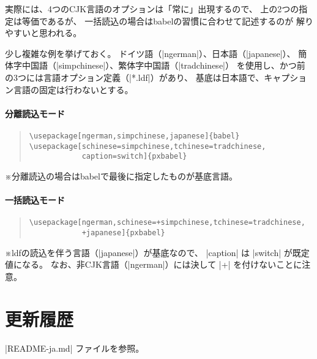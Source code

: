 \documentclass[a4paper,uplatex]{jsarticle}
\newcommand{\Pkg}[1]{\textsf{#1}}
\newcommand{\Note}{\par\noindent ※}
\begin{document}
実際には、4つのCJK言語のオプションは「常に」出現するので、
上の2つの指定は等価であるが、
一括読込の場合は\Pkg{babel}の習慣に合わせて記述するのが
解りやすいと思われる。

少し複雑な例を挙げておく。
ドイツ語（|ngerman|）、日本語（|japanese|）、
簡体字中国語（|simpchinese|）、繁体字中国語（|tradchinese|）
を使用し、かつ前の3つには言語オプション定義（|*.ldf|）があり、
基底は日本語で、キャプション言語の固定は行わないとする。

\paragraph{分離読込モード}

\begin{quote}\begin{verbatim}
\usepackage[ngerman,simpchinese,japanese]{babel}
\usepackage[schinese=simpchinese,tchinese=tradchinese,
            caption=switch]{pxbabel}
\end{verbatim}\end{quote}

\Note 分離読込の場合は\Pkg{babel}で最後に指定したものが基底言語。

\paragraph{一括読込モード}
\begin{quote}\begin{verbatim}
\usepackage[ngerman,schinese=+simpchinese,tchinese=tradchinese,
            +japanese]{pxbabel}
\end{verbatim}\end{quote}

\Note ldfの読込を伴う言語（|japanese|）が基底なので、
|caption| は |switch| が既定値になる。
なお、非CJK言語（|ngerman|）には決して |+| を付けないことに注意。

\section{更新履歴}

|README-ja.md| ファイルを参照。

\end{document}
